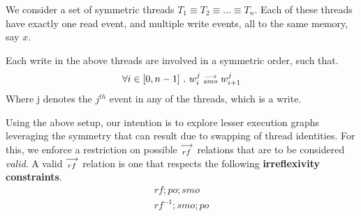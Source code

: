         We consider a set of symmetric threads $T_1 \equiv T_2 \equiv ... \equiv T_n$. Each of these threads have exactly one read event, and multiple write events, all to the same memory, say $x$. 

        Each write in the above threads are involved in a symmetric order, such that. 
        \begin{align*}
            \forall i \in [0, n-1] \ . \ w_i^j\stackrel{\longrightarrow}{_{smo}}w_{i+1}^j
        \end{align*}
        Where j denotes the $j^{th}$ event in any of the threads, which is a write. 

        Using the above setup, our intention is to explore lesser execution graphs leveraging the symmetry that can result due to swapping of thread identities. For this, we enforce a restriction on possible $\stackrel{\longrightarrow}{_{rf}}$ relations that are to be considered \emph{valid}. A valid $\stackrel{\longrightarrow}{_{rf}}$ relation is one that respects the following \textbf{irreflexivity constraints}. 
        \begin{align*}
            rf;po;smo \\
            rf^{-1};smo;po 
        \end{align*}



        


